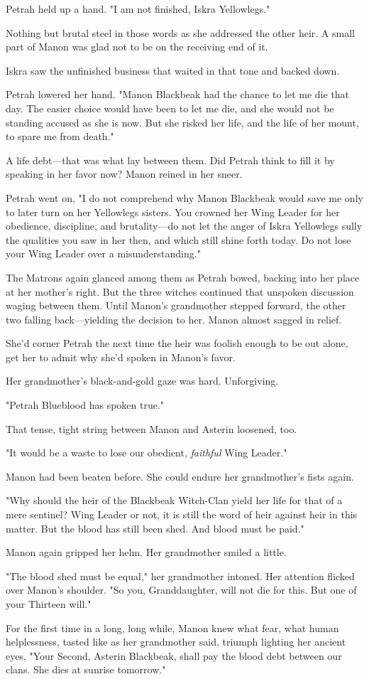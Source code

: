 Petrah held up a hand.
"I am not finished, Iskra Yellowlegs."

Nothing but brutal steel in those words as she addressed the other heir.
A small part of Manon was glad not to be on the receiving end of it.

Iskra saw the unfinished business that waited in that tone and backed down.

Petrah lowered her hand.
"Manon Blackbeak had the chance to let me die that day.
The easier choice would have been to let me die, and she would not be standing accused as she is now.
But she risked her life, and the life of her mount, to spare me from death."

A life debt---that was what lay between them.
Did Petrah think to fill it by speaking in her favor now?
Manon reined in her sneer.

Petrah went on, "I do not comprehend why Manon Blackbeak would save me only to later turn on her Yellowlegs sisters.
You crowned her Wing Leader for her obedience, discipline, and brutality---do not let the anger of Iskra Yellowlegs sully the qualities you saw in her then, and which still shine forth today.
Do not lose your Wing Leader over a misunderstanding."

The Matrons again glanced among them as Petrah bowed, backing into her place at her mother's right.
But the three witches continued that unspoken discussion waging between them.
Until Manon's grandmother stepped forward, the other two falling back---yielding the decision to her.
Manon almost sagged in relief.

She'd corner Petrah the next time the heir was foolish enough to be out alone, get her to admit why she'd spoken in Manon's favor.

Her grandmother's black-and-gold gaze was hard.
Unforgiving.

"Petrah Blueblood has spoken true."

That tense, tight string between Manon and Asterin loosened, too.

"It would be a waste to lose our obedient, \emph{faithful} Wing Leader."

Manon had been beaten before.
She could endure her grandmother's fists again.

"Why should the heir of the Blackbeak Witch-Clan yield her life for that of a mere sentinel?
Wing Leader or not, it is still the word of heir against heir in this matter.
But the blood has still been shed.
And blood must be paid."

Manon again gripped her helm.
Her grandmother smiled a little.

"The blood shed must be equal," her grandmother intoned.
Her attention flicked over Manon's shoulder.
"So you, Granddaughter, will not die for this.
But one of your Thirteen will."

For the first time in a long, long while, Manon knew what fear, what human helplessness, tasted like as her grandmother said, triumph lighting her ancient eyes, "Your Second, Asterin Blackbeak, shall pay the blood debt between our clans.
She dies at sunrise tomorrow."
